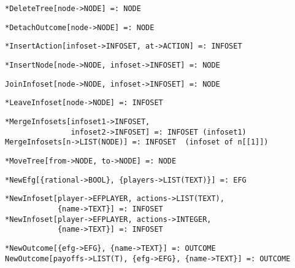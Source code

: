 \protect \large \begin{verbatim}
*DeleteTree[node->NODE] =: NODE
\end{verbatim}\normalsize

\protect \large \begin{verbatim}
*DetachOutcome[node->NODE] =: NODE
\end{verbatim}\normalsize

\protect \large \begin{verbatim}
*InsertAction[infoset->INFOSET, at->ACTION] =: INFOSET 
\end{verbatim}\normalsize

\protect \large \begin{verbatim}
*InsertNode[node->NODE, infoset->INFOSET] =: NODE
\end{verbatim}\normalsize

\protect \large \begin{verbatim}
JoinInfoset[node->NODE, infoset->INFOSET] =: NODE
\end{verbatim}\normalsize

\protect \large \begin{verbatim}
*LeaveInfoset[node->NODE] =: INFOSET
\end{verbatim}\normalsize


\protect \large \begin{verbatim}
*MergeInfosets[infoset1->INFOSET,
               infoset2->INFOSET] =: INFOSET (infoset1)
MergeInfosets[n->LIST(NODE)] =: INFOSET  (infoset of n[[1]])
\end{verbatim}\normalsize


\protect \large \begin{verbatim}
*MoveTree[from->NODE, to->NODE] =: NODE
\end{verbatim}\normalsize

\protect \large \begin{verbatim} 
*NewEfg[{rational->BOOL}, {players->LIST(TEXT)}] =: EFG
\end{verbatim}\normalsize


\protect \large \begin{verbatim} 
*NewInfoset[player->EFPLAYER, actions->LIST(TEXT),
            {name->TEXT}] =: INFOSET
*NewInfoset[player->EFPLAYER, actions->INTEGER,
            {name->TEXT}] =: INFOSET
\end{verbatim}\normalsize

\protect \large \begin{verbatim} 
*NewOutcome[{efg->EFG}, {name->TEXT}] =: OUTCOME
NewOutcome[payoffs->LIST(T), {efg->EFG}, {name->TEXT}] =: OUTCOME
\end{verbatim}\normalsize

